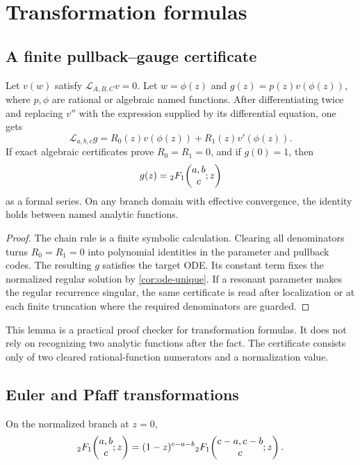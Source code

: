 \section{Transformation formulas}\label{sec:transformations}

\subsection{A finite pullback--gauge certificate}

\begin{lemma}\label{lem:pullback-certificate}
Let \(v(w)\) satisfy \(\mathcal L_{A,B,C}v=0\).  Let
\(w=\phi(z)\) and \(g(z)=p(z)v(\phi(z))\), where \(p,\phi\) are rational or
algebraic named functions.  After differentiating twice and replacing
\(v''\) with the expression supplied by its differential equation, one gets
\[
 \mathcal L_{a,b,c}g=R_0(z)v(\phi(z))+R_1(z)v'(\phi(z)).
\]
If exact algebraic certificates prove \(R_0=R_1=0\), and if
\(g(0)=1\), then
\[
 g(z)={}_2F_1\!\left(\begin{matrix}a,b\\c\end{matrix};z\right)
\]
as a formal series.  On any branch domain with effective convergence, the
identity holds between named analytic functions.
\end{lemma}

\begin{proof}
The chain rule is a finite symbolic calculation.  Clearing all denominators
turns \(R_0=R_1=0\) into polynomial identities in the parameter and pullback
codes.  The resulting \(g\) satisfies the target ODE.  Its constant term fixes
the normalized regular solution by \cref{cor:ode-unique}.  If a resonant
parameter makes the regular recurrence singular, the same certificate is
read after localization or at each finite truncation where the required
denominators are guarded.
\end{proof}

\begin{remark}
This lemma is a practical proof checker for transformation formulas.  It does
not rely on recognizing two analytic functions after the fact.  The
certificate consists only of two cleared rational-function numerators and a
normalization value.
\end{remark}

\subsection{Euler and Pfaff transformations}

\begin{theorem}\label{thm:euler-transform}
On the normalized branch at \(z=0\),
\begin{equation}\label{eq:euler-transform}
 {}_2F_1\!\left(\begin{matrix}a,b\\c\end{matrix};z\right)=(1-z)^{c-a-b}{}_2F_1\!\left(\begin{matrix}c-a,c-b\\c\end{matrix};z\right).
\end{equation}
\end{theorem}

